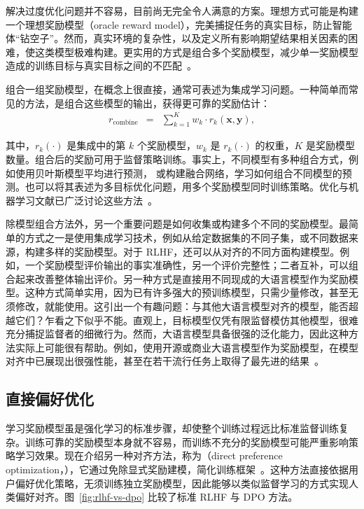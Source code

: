 解决过度优化问题并不容易，目前尚无完全令人满意的方案。理想方式可能是构建一个理想奖励模型（oracle reward model），完美捕捉任务的真实目标，防止智能体“钻空子”。然而，真实环境的复杂性，以及定义所有影响期望结果相关因素的困难，使这类模型极难构建。更实用的方式是组合多个奖励模型，减少单一奖励模型造成的训练目标与真实目标之间的不匹配~\cite{coste-etal:2024reward}。

组合一组奖励模型，在概念上很直接，通常可表述为集成学习问题。一种简单而常见的方法，是组合这些模型的输出，获得更可靠的奖励估计：
\begin{eqnarray}
r_{\mathrm{combine}} & = & \sum_{k=1}^{K} w_k \cdot r_k(\mathbf{x},\mathbf{y}),
\end{eqnarray}

\noindent 其中，$r_k(\cdot)$ 是集成中的第 $k$ 个奖励模型，$w_k$ 是 $r_k(\cdot)$ 的权重，$K$ 是奖励模型数量。组合后的奖励可用于监督策略训练。事实上，不同模型有多种组合方式，例如使用贝叶斯模型平均进行预测，
或构建融合网络，学习如何组合不同模型的预测。也可以将其表述为多目标优化问题，用多个奖励模型同时训练策略。优化与机器学习文献已广泛讨论这些方法~\cite{miettinen:1999nonlinear,Bishop:2006}。

除模型组合方法外，另一个重要问题是如何收集或构建多个不同的奖励模型。最简单的方式之一是使用集成学习技术，例如从给定数据集的不同子集，或不同数据来源，构建多样的奖励模型。对于 RLHF，还可以从对齐的不同方面构建模型。例如，一个奖励模型评价输出的事实准确性，另一个评价完整性；二者互补，可以组合起来改善整体输出评价。另一种方式是直接用不同现成的大语言模型作为奖励模型。这种方式简单实用，因为已有许多强大的预训练模型，只需少量修改，甚至无须修改，就能使用。这引出一个有趣问题：与其他大语言模型对齐的模型，能否超越它们？乍看之下似乎不能。直观上，目标模型仅凭有限监督模仿其他模型，很难充分捕捉监督者的细微行为。然而，大语言模型具备很强的泛化能力，因此这种方法实际上可能很有帮助。例如，使用开源或商业大语言模型作为奖励模型，在模型对齐中已展现出很强性能，甚至在若干流行任务上取得了最先进的结果~\cite{lambert-etal:2024rewardbench}。

\subsection{直接偏好优化}

\noindent 学习奖励模型虽是强化学习的标准步骤，却使整个训练过程远比标准监督训练复杂。训练可靠的奖励模型本身就不容易，而训练不充分的奖励模型可能严重影响策略学习效果。现在介绍另一种对齐方法，称为（direct preference optimization，），它通过免除显式奖励建模，简化训练框架~\cite{rafailov-etal:2024direct}。这种方法直接依据用户偏好优化策略，无须训练独立奖励模型，因此能够以类似监督学习的方式实现人类偏好对齐。图~\ref{fig:rlhf-vs-dpo} 比较了标准 RLHF 与 DPO 方法。

